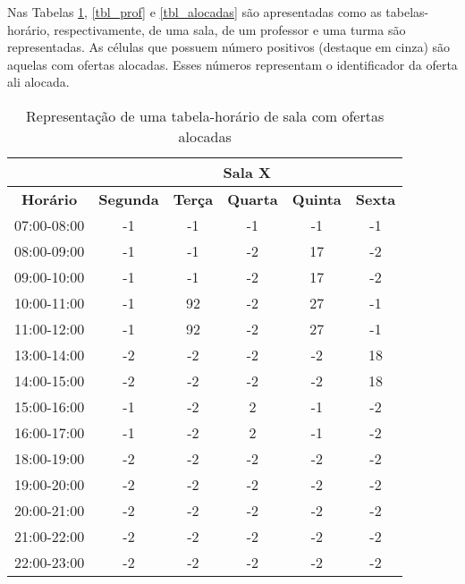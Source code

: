 Nas Tabelas \ref{tbl_ofertas}, \ref{tbl_prof} e \ref{tbl_alocadas} são apresentadas como as tabelas-horário, respectivamente, de uma sala, de um professor e uma turma são representadas. As células que possuem número positivos (destaque em cinza) são aquelas com ofertas alocadas. Esses números representam o identificador da oferta ali alocada.

\begin{table}[H]
\centering
\begin{tabular}{|c|c|c|c|c|c|}
\hline
\textbf{} & \multicolumn{5}{c|}{\textbf{Sala X}} \\ \hline
\textbf{Horário} & \textbf{Segunda} & \textbf{Terça} & \textbf{Quarta} & \textbf{Quinta} & \textbf{Sexta} \\ \hline
07:00-08:00 & -1 & -1 & -1 & -1 & -1 \\ \hline
08:00-09:00 & -1 & -1 & -2 & \cellcolor[HTML]{C0C0C0}17 & -2 \\ \hline
09:00-10:00 & -1 & -1 & -2 & \cellcolor[HTML]{C0C0C0}17 & -2 \\ \hline
10:00-11:00 & -1 & \cellcolor[HTML]{C0C0C0}92 & -2 & \cellcolor[HTML]{C0C0C0}27 & -1 \\ \hline
11:00-12:00 & -1 & \cellcolor[HTML]{C0C0C0}92 & -2 & \cellcolor[HTML]{C0C0C0}27 & -1 \\ \hline
13:00-14:00 & -2 & -2 & -2 & -2 & \cellcolor[HTML]{C0C0C0}18 \\ \hline
14:00-15:00 & -2 & -2 & -2 & -2 & \cellcolor[HTML]{C0C0C0}18 \\ \hline
15:00-16:00 & -1 & -2 & \cellcolor[HTML]{C0C0C0}2 & -1 & -2 \\ \hline
16:00-17:00 & -1 & -2 & \cellcolor[HTML]{C0C0C0}2 & -1 & -2 \\ \hline
18:00-19:00 & -2 & -2 & -2 & -2 & -2 \\ \hline
19:00-20:00 & -2 & -2 & -2 & -2 & -2 \\ \hline
20:00-21:00 & -2 & -2 & -2 & -2 & -2 \\ \hline
21:00-22:00 & -2 & -2 & -2 & -2 & -2 \\ \hline
22:00-23:00 & -2 & -2 & -2 & -2 & -2 \\ \hline
\end{tabular}
\caption{Representação de uma tabela-horário de sala com ofertas alocadas}
\label{tbl_ofertas}
\end{table}

